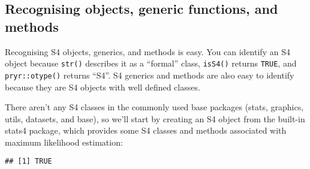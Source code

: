 \hypertarget{recognising-objects-generic-functions-and-methods-1}{%
\subsection{Recognising objects, generic functions, and
methods}\label{recognising-objects-generic-functions-and-methods-1}}

Recognising S4 objects, generics, and methods is easy. You can identify
an S4 object because \texttt{str()} describes it as a ``formal'' class,
\texttt{isS4()} returns \texttt{TRUE}, and \texttt{pryr::otype()}
returns ``S4''. S4 generics and methods are also easy to identify
because they are S4 objects with well defined classes.

There aren't any S4 classes in the commonly used base packages (stats,
graphics, utils, datasets, and base), so we'll start by creating an S4
object from the built-in stats4 package, which provides some S4 classes
and methods associated with maximum likelihood estimation:

\begin{Shaded}
\begin{Highlighting}[]

\StringTok{ }\NormalTok{(}\NormalTok{, }\NormalTok{, }\NormalTok{, }\NormalTok{, }\NormalTok{, }\NormalTok{, }\NormalTok{, }\NormalTok{, }\NormalTok{, }\NormalTok{, }\NormalTok{)}
\StringTok{ }\OperatorTok{-}\StringTok{ }\NormalTok{(} \NormalTok{))}
\StringTok{ } \NormalTok{(} \NormalTok{), } 

\end{Highlighting}
\end{Shaded}

\begin{verbatim}
## [1] TRUE
\end{verbatim}

\begin{Shaded}
\begin{Highlighting}[]
\end{Highlighting}
\end{Shaded}

